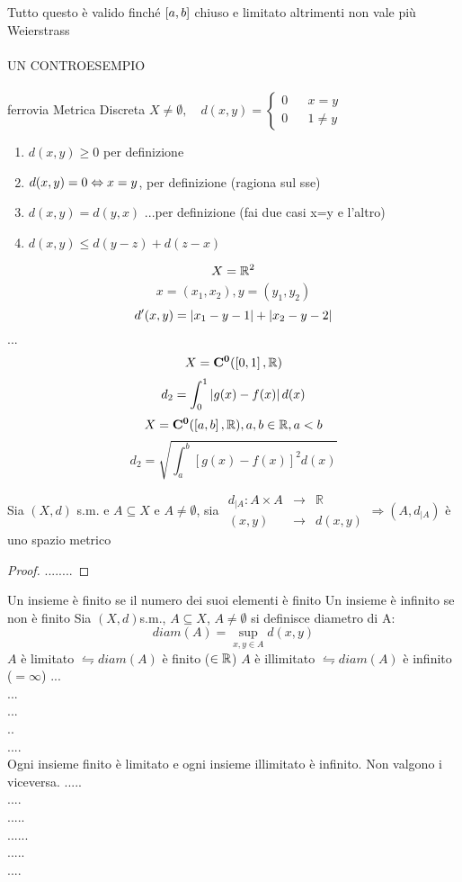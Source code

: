 \observation 
Tutto questo è valido finché $\left[a,b\right]$ chiuso e limitato altrimenti non vale più Weierstrass \\
\\
UN CONTROESEMPIO\\
\\
\example
ferrovia
\example
Metrica Discreta
$X\ne \emptyset,\quad d(x,y)= \left\{\begin{matrix}0&&x=y\\0&&1\ne y\end{matrix}\right.$
	\begin{enumerate}
		\item $d(x,y)\ge 0$ per definizione
		\item $d(x,y)=0\Leftrightarrow x=y$, per definizione (ragiona sul sse) 
		\item $d(x,y)=d(y,x)$ ...per definizione (fai due casi x=y e l'altro)
		\item $d(x,y)\le d(y-z)+d(z-x)$ 
	\end{enumerate}
\example
$$X=\mathbb{R}^{2}$$
$$x=(x_1,x_2), y=(y_1,y_2)$$
$$d'(x,y)=\left|x_1-y-1\right|+\left|x_2-y-2\right|$$
...\\

\example
\example
$$X=\mathbf{C^{0}}(\left[0,1\right],\mathbb{R})$$
$$d_2=\int_0^1\left|g(x)-f(x)\right|d(x)$$
\example
$$X=\mathbf{C^{0}}(\left[a,b\right],\mathbb{R}), a,b\in\mathbb{R}, a<b$$
$$d_2=\sqrt{\int_a^b\left[g(x)-f(x)\right]^2d(x)}$$

\proposition
Sia $(X,d)$ s.m. e $A\subseteq X$ e $A\ne \emptyset$, sia $\begin{array}{rcl} d_{|A} : A\times A & \to & \mathbb{R} \\ (x,y) & \to & d(x,y) \end{array} \Rightarrow (A,d_{|A})$ è uno spazio metrico
\begin{proof}
	........
\end{proof}

Un insieme è finito se il numero dei suoi elementi è finito
Un insieme è infinito se non è finito
Sia $(X,d)$s.m., $A\subseteq X$, $A\ne \emptyset$ si definisce diametro di A: $$diam(A)=\sup\limits_{x,y\in A}d(x,y)$$
$A$ è limitato $\leftrightharpoons diam(A)$ è finito ($\in\mathbb{R}$)
$A$ è illimitato $\leftrightharpoons diam(A)$ è infinito ($=\infty$)
\example
...\\
...\\
...\\
..\\
....\\
\observation
Ogni insieme finito è limitato e ogni insieme illimitato è infinito. Non valgono i viceversa.
\example 
.....\\
....\\
.....\\
......\\
.....\\
....\\

